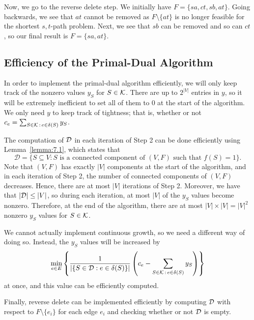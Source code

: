 Now, we go to the reverse delete step. We initially have $F = \{sa, ct, sb, at\}$. 
Going backwards, we see that $at$ cannot be removed as $F \setminus \{at\}$ 
is no longer feasible for the shortest $s,t$-path problem. Next, we 
see that $sb$ can be removed and so can $ct$, so our final result is 
$F = \{sa, at\}$. 

\subsection{Efficiency of the Primal-Dual Algorithm} \label{subsec:7.5}
In order to implement the primal-dual algorithm efficiently, we will 
only keep track of the nonzero values $y_S$ for $S \in {\cal K}$. 
There are up to $2^{|V|}$ entries in $y$, so it will be extremely 
inefficient to set all of them to $0$ at the start of the algorithm.
We only need $y$ to keep track of tightness; that is, whether or not
$c_e = \sum_{S \in {\cal K}\,:\,e \in \delta(S)} y_S$. 

The computation of ${\cal D}$ in each iteration of Step 2 
can be done efficiently using Lemma~\ref{lemma:7.1}, which states that 
\[ \mathcal{D} = \{S \subseteq V : \text{$S$ is a connected component of $(V, F)$ 
such that $f(S) = 1$}\}. \]
Note that $(V, F)$ has exactly $|V|$ components at the start of the 
algorithm, and in each iteration of Step 2, the number of connected 
components of $(V, F)$ decreases. Hence, there are at most 
$|V|$ iterations of Step 2. Moreover, we have that $|{\cal D}| \leq |V|$, 
so during each iteration, at most $|V|$ of the $y_S$ values become nonzero.
Therefore, at the end of the algorithm, there are at most $|V| \times |V| = 
|V|^2$ nonzero $y_S$ values for $S \in {\cal K}$. 

We cannot actually implement continuous growth, so we need a different 
way of doing so. Instead, the $y_S$ values will be increased by 
\[ \min_{e\in E} \left\{ \frac{1}{|\{S \in {\cal D} : e \in \delta(S)\}|} 
\left( c_e - \sum_{S \in {\cal K}\,:\,e \in \delta(S)} y_S \right) \right\} \] 
at once, and this value can be efficiently computed.

Finally, reverse delete can be implemented efficiently by computing 
${\cal D}$ with respect to $F \setminus \{e_i\}$ for each edge $e_i$ 
and checking whether or not ${\cal D}$ is empty.

